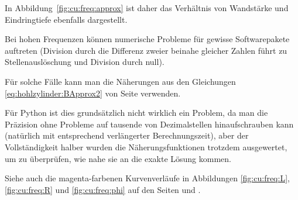 {\begin{minipage}[t]{0.33\textwidth}
        In Abbildung~\ref{fig:cu:freq:approx}  ist daher das  Verh\"altnis von
        Wandst\"arke und Eindringtiefe ebenfalls dargestellt.
        
	\end{minipage}%
	\begin{minipage}[t]{0.67\textwidth}
        \vspace{0pt}\raggedright
        \resizebox{.95\textwidth}{!}{}
        \label{fig:cu:freq:approx}
	\end{minipage}


	\begin{minipage}[t]{0.33\textwidth}
        \vspace{0pt}
        Bei  hohen  Frequenzen  k\"onnen  numerische  Probleme  f\"ur  gewisse
        Softwarepakete auftreten (Division durch  die Differenz zweier beinahe
        gleicher  Zahlen f\"uhrt  zu Stellenausl\"oschung  und Division  durch
        null).

        F\"ur    solche    F\"alle    kann   man    die    N\"aherungen    aus
        den     Gleichungen    \ref{eq:hohlzylinder:BApprox2}     von    Seite
        \pageref{eq:hohlzylinder:BApprox2} verwenden.

        F\"ur Python ist  dies grunds\"atzlich nicht wirklich  ein Problem, da
        man  die Pr\"azision  ohne  Probleme auf  tausende von  Dezimalstellen
        hinaufschrauben  kann  (nat\"urlich  mit  entsprechend  verl\"angerter
        Berechnungszeit),  aber   der  Vollst\"andigkeit  halber   wurden  die
        N\"aherungsfunktionen trotzdem ausgewertet,  um zu \"uberpr\"ufen, wie
        nahe sie an die exakte L\"osung kommen.

        Siehe  auch  die   magenta-farbenen  Kurvenverl\"aufe  in  Abbildungen
        \ref{fig:cu:freq:L}, \ref{fig:cu:freq:R} und \ref{fig:cu:freq:phi} auf
        den Seiten \pageref{fig:cu:freq:L} und \pageref{fig:cu:freq:phi}.

        
	\end{minipage}%
	\begin{minipage}[t]{0.67\textwidth}
        \vspace{0pt}\raggedright
        \resizebox{.95\textwidth}{!}{}
        \label{fig:cu:freq:approx2}
	\end{minipage}


}
